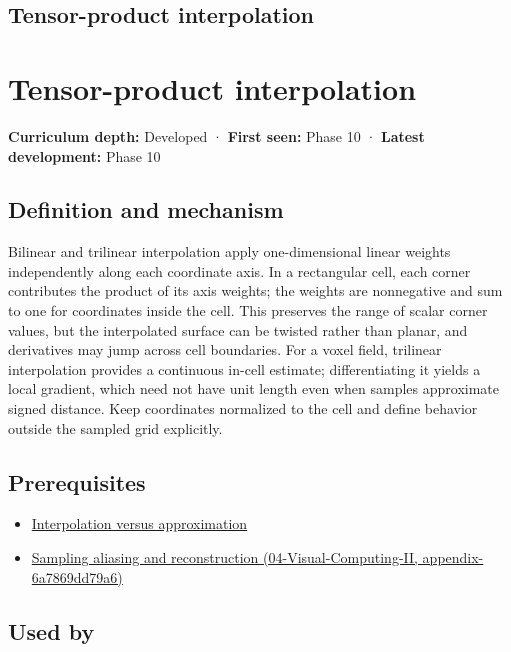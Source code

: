 \hypertarget{appendix-0a09b6dfdc86}{}
\section*{Tensor-product interpolation}
\chapter{Tensor-product interpolation}\label{appendix-0a09b6dfdc86-tensor-product-interpolation}

\textbf{Curriculum depth:} Developed · \textbf{First seen:} Phase 10 · \textbf{Latest development:} Phase 10

\section{Definition and mechanism}\label{appendix-0a09b6dfdc86-definition-and-mechanism}

Bilinear and trilinear interpolation apply one-dimensional linear weights independently along each coordinate axis. In a rectangular cell, each corner contributes the product of its axis weights; the weights are nonnegative and sum to one for coordinates inside the cell. This preserves the range of scalar corner values, but the interpolated surface can be twisted rather than planar, and derivatives may jump across cell boundaries. For a voxel field, trilinear interpolation provides a continuous in-cell estimate; differentiating it yields a local gradient, which need not have unit length even when samples approximate signed distance. Keep coordinates normalized to the cell and define behavior outside the sampled grid explicitly.

\section{Prerequisites}\label{appendix-0a09b6dfdc86-prerequisites}

\begin{itemize}
\tightlist
\item
  \hyperref[appendix-0c2a5f69851e]{Interpolation versus approximation}
\item
  \href{../04-Visual-Computing-II/main.pdf\#nameddest=appendix-6a7869dd79a6}{Sampling aliasing and reconstruction (04-Visual-Computing-II, appendix-6a7869dd79a6)}
\end{itemize}

\section{Used by}\label{appendix-0a09b6dfdc86-used-by}

